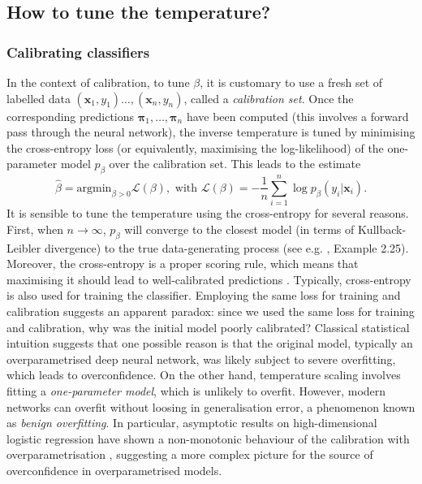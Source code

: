 \documentclass[10pt,dvipsnames]{article}
\newcommand{\bx}{\mathbf{x}}%
\theoremstyle{plain}
\theoremstyle{definition}
\theoremstyle{remark}
\begin{document}
\subsection{How to tune the temperature?}


\subsubsection{Calibrating classifiers}
In the context of calibration, to tune $\beta$, it is customary to use a fresh set of labelled data $(\bx_1,y_1) \ldots, (\bx_n,y_n)$, called a \emph{calibration set}. Once the corresponding predictions $\boldsymbol{\pi}_1,   \ldots ,\boldsymbol{\pi}_n$ have been computed (this involves a forward pass through the neural network),  the inverse temperature is tuned by minimising the cross-entropy loss (or equivalently, maximising the log-likelihood) of the one-parameter model $p_\beta$ over the calibration set. This leads to the estimate
\begin{equation}
	\hat{\beta} = \text{argmin}_{\beta > 0} \mathcal{L}(\beta), \text{ with } \mathcal{L}(\beta) = -\frac{1}{n} \sum_{i=1}^n \log  p_{\beta} ( y_i | \bx_i). %
\end{equation}
It is sensible to tune the temperature using the cross-entropy for several reasons. First, when $n \rightarrow \infty$, $p_{\beta}$ will converge to the closest model (in terms of Kullback-Leibler divergence) to the true data-generating process (see e.g. \citealp{van2000asymptotic}, Example 2.25). Moreover, the cross-entropy is a proper scoring rule, which means that maximising it should lead to well-calibrated predictions \citep{blasiok2023does}. Typically, cross-entropy is also used for training the classifier.  Employing the same loss for training and calibration suggests an apparent paradox: since we used the same loss for training and calibration, why was the initial model poorly calibrated? 
Classical statistical intuition suggests that one possible reason is that the original model, typically an overparametrised deep neural network, was likely subject to severe overfitting, which leads to overconfidence. On the other hand, temperature scaling involves fitting a \emph{one-parameter model}, which is unlikely to overfit. However, modern networks can overfit without loosing in generalisation error, a phenomenon known as \emph{benign overfitting}. In particular, asymptotic results on high-dimensional logistic regression have shown a non-monotonic behaviour of the calibration with overparametrisation \citep{bai2021don,clarte2023double, clarte2023theoretical}, suggesting a more complex picture for the source of overconfidence in overparametrised models. 
\end{document}
